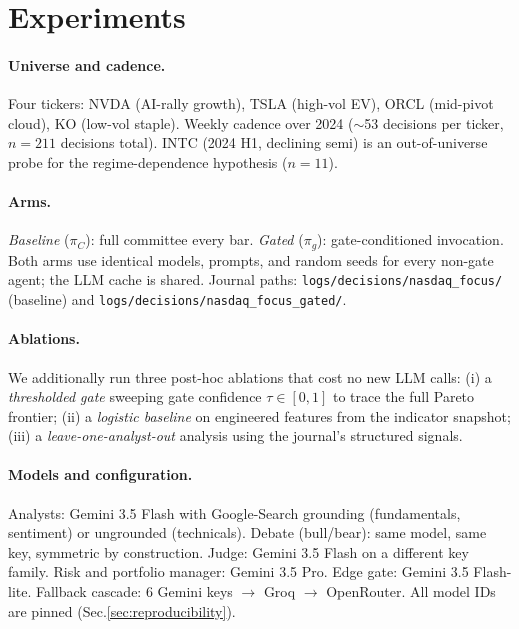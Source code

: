 \documentclass[11pt,a4paper]{article}
\begin{document}
\section{Experiments}
\label{sec:experiments}

\paragraph{Universe and cadence.}
Four tickers: NVDA (AI-rally growth), TSLA (high-vol EV), ORCL
(mid-pivot cloud), KO (low-vol staple). Weekly cadence over 2024
($\sim$53 decisions per ticker, $n=211$ decisions total). INTC
(2024 H1, declining semi) is an out-of-universe probe for the
regime-dependence hypothesis ($n=11$).

\paragraph{Arms.}
\emph{Baseline} ($\pi_C$): full committee every bar. \emph{Gated}
($\pi_g$): gate-conditioned invocation. Both arms use identical models,
prompts, and random seeds for every non-gate agent; the LLM cache is
shared. Journal paths:
\verb|logs/decisions/nasdaq_focus/| (baseline) and
\verb|logs/decisions/nasdaq_focus_gated/|.

\paragraph{Ablations.}
We additionally run three post-hoc ablations that cost no new LLM calls:
(i) a \emph{thresholded gate} sweeping gate confidence $\tau \in [0,1]$
to trace the full Pareto frontier; (ii) a \emph{logistic baseline} on
engineered features from the indicator snapshot; (iii) a
\emph{leave-one-analyst-out} analysis using the journal's structured
signals.

\paragraph{Models and configuration.}
Analysts: Gemini 3.5 Flash with Google-Search grounding (fundamentals,
sentiment) or ungrounded (technicals). Debate (bull/bear): same model,
same key, symmetric by construction. Judge: Gemini 3.5 Flash on a
different key family. Risk and portfolio manager: Gemini 3.5 Pro.
Edge gate: Gemini 3.5 Flash-lite. Fallback cascade: 6 Gemini keys
$\to$ Groq $\to$ OpenRouter. All model IDs are pinned (Sec.\ref{sec:reproducibility}).
\end{document}
